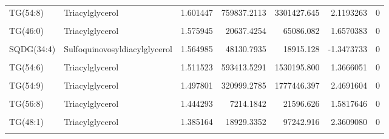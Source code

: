 \begin{table}[!h]
\begin{tabular}[t]{llrrrrr}
TG(54:8) & Triacylglycerol & 1.601447 & 759837.2113 & 3301427.645 & 2.1193263 & 0\\
\cellcolor{gray!10}{MG(18:2)} & \cellcolor{gray!10}{Monoacylglycerol} & \cellcolor{gray!10}{1.594468} & \cellcolor{gray!10}{205707.8256} & \cellcolor{gray!10}{92097.326} & \cellcolor{gray!10}{-1.1593568} & \cellcolor{gray!10}{0}\\
TG(46:0) & Triacylglycerol & 1.575945 & 20637.4254 & 65086.082 & 1.6570383 & 0\\
\cellcolor{gray!10}{SQDG(34:1)} & \cellcolor{gray!10}{Sulfoquinovosyldiacylglycerol} & \cellcolor{gray!10}{1.573280} & \cellcolor{gray!10}{88024.1165} & \cellcolor{gray!10}{34956.257} & \cellcolor{gray!10}{-1.3323233} & \cellcolor{gray!10}{0}\\
\addlinespace
SQDG(34:4) & Sulfoquinovosyldiacylglycerol & 1.564985 & 48130.7935 & 18915.128 & -1.3473733 & 0\\
\cellcolor{gray!10}{PE(36:3)} & \cellcolor{gray!10}{Glycerophosphoethanolamine} & \cellcolor{gray!10}{1.559219} & \cellcolor{gray!10}{122676.0826} & \cellcolor{gray!10}{293301.422} & \cellcolor{gray!10}{1.2575232} & \cellcolor{gray!10}{0}\\
TG(54:6) & Triacylglycerol & 1.511523 & 593413.5291 & 1530195.800 & 1.3666051 & 0\\
\cellcolor{gray!10}{MG(16:0)} & \cellcolor{gray!10}{Monoacylglycerol} & \cellcolor{gray!10}{1.502405} & \cellcolor{gray!10}{545508.5351} & \cellcolor{gray!10}{328747.169} & \cellcolor{gray!10}{-0.7306216} & \cellcolor{gray!10}{0}\\
TG(54:9) & Triacylglycerol & 1.497801 & 320999.2785 & 1777446.397 & 2.4691604 & 0\\
\addlinespace
\cellcolor{gray!10}{PC(32:0)} & \cellcolor{gray!10}{Phosphatidylcholine} & \cellcolor{gray!10}{1.475151} & \cellcolor{gray!10}{469092.0628} & \cellcolor{gray!10}{1050768.745} & \cellcolor{gray!10}{1.1635005} & \cellcolor{gray!10}{0}\\
TG(56:8) & Triacylglycerol & 1.444293 & 7214.1842 & 21596.626 & 1.5817646 & 0\\
\cellcolor{gray!10}{TG(48:0)} & \cellcolor{gray!10}{Triacylglycerol} & \cellcolor{gray!10}{1.436629} & \cellcolor{gray!10}{63097.3544} & \cellcolor{gray!10}{110869.707} & \cellcolor{gray!10}{0.8132040} & \cellcolor{gray!10}{0}\\
TG(48:1) & Triacylglycerol & 1.385164 & 18929.3352 & 97242.916 & 2.3609080 & 0\\
\cellcolor{gray!10}{PC(36:4)} & \cellcolor{gray!10}{Glycerophosphocholine} & \cellcolor{gray!10}{1.374004} & \cellcolor{gray!10}{8044052.0159} & \cellcolor{gray!10}{4089968.002} & \cellcolor{gray!10}{-0.9758327} & \cellcolor{gray!10}{0}\\

\end{tabular}
\end{table}
